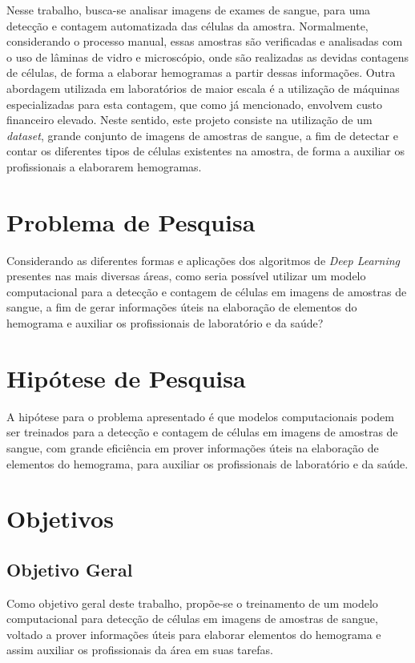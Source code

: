 Nesse trabalho, busca-se analisar imagens de exames de sangue, para uma detecção e contagem automatizada das células da amostra. Normalmente, considerando o processo manual, essas amostras são verificadas e analisadas com o uso de lâminas de vidro e microscópio, onde são realizadas as devidas contagens de células, de forma a elaborar hemogramas a partir dessas informações. Outra abordagem utilizada em laboratórios de maior escala é a utilização de máquinas especializadas para esta contagem, que como já mencionado, envolvem custo financeiro elevado. Neste sentido, este projeto consiste na utilização de um \emph{dataset}, grande conjunto de imagens de amostras de sangue, a fim de detectar e contar os diferentes tipos de células existentes na amostra, de forma a auxiliar os profissionais a elaborarem hemogramas.

\section{Problema de Pesquisa}
\label{sec:problema}

Considerando as diferentes formas e aplicações dos algoritmos de \emph{Deep Learning} presentes nas mais diversas áreas, como seria possível utilizar um modelo computacional para a detecção e contagem de células em imagens de amostras de sangue, a fim de gerar informações úteis na elaboração de elementos do hemograma e auxiliar os profissionais de laboratório e da saúde?

\section{Hipótese de Pesquisa}
\label{sec:hipotese}
A hipótese para o problema apresentado é que modelos computacionais podem ser treinados para a detecção e contagem de células em imagens de amostras de sangue, com grande eficiência em prover informações úteis na elaboração de elementos do hemograma, para auxiliar os profissionais de laboratório e da saúde.

\section{Objetivos}
\label{sec:objetivos}

\subsection{Objetivo Geral}
Como objetivo geral deste trabalho, propõe-se o treinamento de um modelo computacional para detecção de células em imagens de amostras de sangue, voltado a prover informações úteis para elaborar elementos do hemograma e assim auxiliar os profissionais da área em suas tarefas.


